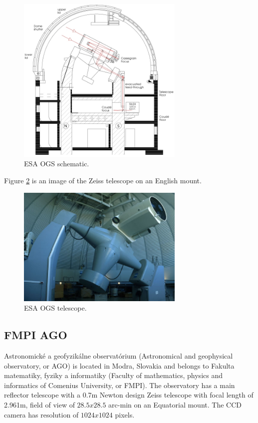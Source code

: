 \begin{figure}[H]
\centering
  \includegraphics[width=8cm]{images/ESAOGS1}
  \caption{ESA OGS schematic.}
  \label{fig:esaogs1}
\end{figure}

	Figure \ref{fig:esaogs2} is an image of the Zeiss telescope on an English mount.

\begin{figure}[H]
\centering
  \includegraphics[width=8cm]{images/ESAOGS2}
  \caption{ESA OGS telescope.}
  \label{fig:esaogs2}
\end{figure}

\subsection{FMPI AGO}\label{subsec:fmpi_ago}
Astronomické a geofyzikálne observatórium (Astronomical and geophysical observatory, or AGO) is located in Modra, Slovakia and belongs to Fakulta matematiky, fyziky a informatiky (Faculty of mathematics, physics and informatics of Comenius University, or FMPI). The observatory has a main reflector telescope with a 0.7m Newton design Zeiss telescope with focal length of 2.961m, field of view of $28.5 x 28.5$ arc-min on an Equatorial mount. The CCD camera has resolution of $1024 x 1024$ pixels.

